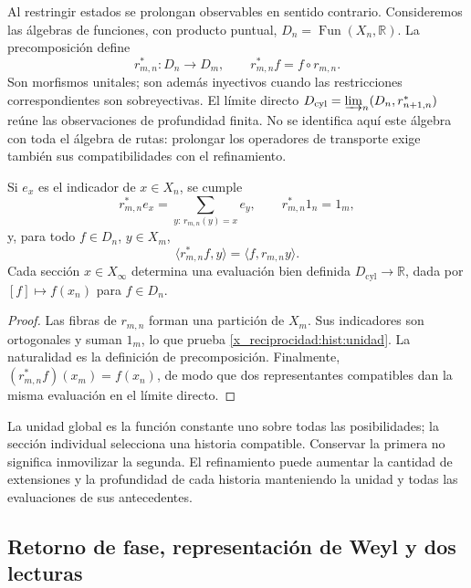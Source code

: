 Al restringir estados se prolongan observables en sentido contrario.
Consideremos las álgebras de funciones, con producto puntual,
\(D_n=\operatorname{Fun}(X_n,\mathbb R)\). La precomposición define
\begin{equation}
 r_{m,n}^*:D_n\longrightarrow D_m,
 \qquad r_{m,n}^*f=f\circ r_{m,n}.
 \label{x_reciprocidad:hist:precomposicion}
\end{equation}
Son morfismos unitales; son además inyectivos cuando las restricciones
correspondientes son sobreyectivas. El límite directo
\(D_{\mathrm{cyl}}=\varinjlim_n(D_n,r_{n+1,n}^*)\) reúne las
observaciones de profundidad finita. No se identifica aquí este álgebra
con toda el álgebra de rutas: prolongar los operadores de transporte exige
también sus compatibilidades con el refinamiento.

\begin{lemma}
Si \(e_x\) es el indicador de \(x\in X_n\), se cumple
\begin{equation}
 r_{m,n}^*e_x=\sum_{y:\,r_{m,n}(y)=x}e_y,
 \qquad r_{m,n}^*1_n=1_m,
 \label{x_reciprocidad:hist:unidad}
\end{equation}
y, para todo \(f\in D_n\), \(y\in X_m\),
\[
 \langle r_{m,n}^*f,y\rangle=\langle f,r_{m,n}y\rangle.
\]
Cada sección \(x\in X_\infty\) determina una evaluación bien definida
\(D_{\mathrm{cyl}}\to\mathbb R\), dada por \([f]\mapsto f(x_n)\)
para \(f\in D_n\).
\end{lemma}
\begin{proof}
Las fibras de \(r_{m,n}\) forman una partición de \(X_m\). Sus
indicadores son ortogonales y suman \(1_m\), lo que prueba
\eqref{x_reciprocidad:hist:unidad}. La naturalidad es la definición de precomposición.
Finalmente, \((r_{m,n}^*f)(x_m)=f(x_n)\), de modo que dos representantes
compatibles dan la misma evaluación en el límite directo.
\end{proof}

La unidad global es la función constante uno sobre todas las posibilidades;
la sección individual selecciona una historia compatible. Conservar la
primera no significa inmovilizar la segunda. El refinamiento puede aumentar
la cantidad de extensiones y la profundidad de cada historia manteniendo
la unidad y todas las evaluaciones de sus antecedentes.

\subsection{Retorno de fase, representación de Weyl y dos lecturas}
\label{x_reciprocidad:hist:puente-lecturas}

